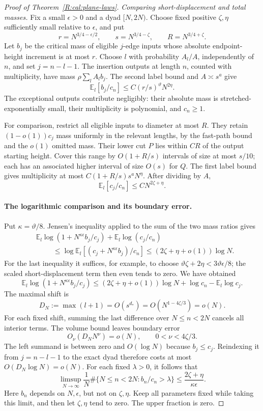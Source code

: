 \begin{proof}[Proof of Theorem~\ref{R:cal:plane-laws}]
\textit{Comparing short-displacement and total masses.}
Fix a small $\epsilon>0$ and a dyad $[N,2N)$. Choose fixed positive
$\zeta,\eta$ sufficiently small relative to $\epsilon$, and put
\[
 r=N^{3/4-\epsilon/2},\qquad
 s=N^{3/4-\zeta},\qquad R=N^{3/4+\zeta}.
\]
Let $b_j$ be the critical mass of eligible $j$-edge inputs whose absolute
endpoint-height increment is at most $r$. Choose $l$ with probability
$A_l/A$, independently of $n$, and set $j=n-l-1$. The insertion outputs
at length $n$, counted with multiplicity, have mass
$\rho\sum_l A_l b_j$. The second label bound and $A\asymp s^a$ give
\[
 \mathbb E_l[b_j/c_n]\le C(r/s)^\vartheta N^{2\eta}.
\]
The exceptional outputs contribute negligibly: their absolute mass is
stretched-exponentially small, their multiplicity is polynomial, and
$c_n\ge1$.

For comparison, restrict all eligible inputs to diameter at most $R$.
They retain $(1-o(1))c_j$ mass uniformly in the relevant lengths, by
the fast-path bound and the $o(1)$ omitted mass. Their lower cut $P$
lies within $CR$ of the output starting height. Cover this range by
$O(1+R/s)$ intervals of size at most $s/10$; each has an associated
higher interval of size $O(s)$ for $Q$. The first label bound gives
multiplicity at most $C(1+R/s)s^aN^\eta$. After dividing by $A$,
\[
 \mathbb E_l[c_j/c_n]\le CN^{2\zeta+\eta}.
\]

\paragraph{The logarithmic comparison and its boundary error.}
Put $\kappa=\vartheta/8$. Jensen's inequality applied to the sum of
the two mass ratios gives
\begin{align*}
 &\mathbb E_l\log(1+N^{\kappa\epsilon}b_j/c_j)
       +\mathbb E_l\log(c_j/c_n)\\
 &\hspace{1cm}\le
       \log\mathbb E_l[(c_j+N^{\kappa\epsilon}b_j)/c_n]
       \le(2\zeta+\eta+o(1))\log N.
\end{align*}
For the last inequality it suffices, for example, to choose
$\vartheta\zeta+2\eta<3\vartheta\epsilon/8$; the scaled short-displacement
term then even tends to zero. We have obtained
\[
 \mathbb E_l\log(1+N^{\kappa\epsilon}b_j/c_j)
 \le(2\zeta+\eta+o(1))\log N
       +\log c_n-\mathbb E_l\log c_j.
\]
The maximal shift is
\[
 D_N:=\max(l+1)=O(s^{d_*})=O(N^{1-4\zeta/3})=o(N).
\]
For each fixed shift, summing the last difference over $N\le n<2N$
cancels all interior terms. The volume bound leaves boundary error
\[
 O_\nu(D_NN^\nu)=o(N),\qquad 0<\nu<4\zeta/3.
\]
The left summand is between zero and $O(\log N)$ because $b_j\le c_j$.
Reindexing it from $j=n-l-1$ to the exact dyad therefore costs at most
$O(D_N\log N)=o(N)$. For each fixed $\lambda>0$, it follows that
\[
 \limsup_{N\to\infty}\frac1N
 \#\{N\le n<2N:b_n/c_n>\lambda\}
 \le\frac{2\zeta+\eta}{\kappa\epsilon}.
\]
Here $b_n$ depends on $N,\epsilon$, but not on $\zeta,\eta$. Keep all
parameters fixed while taking this limit, and then let $\zeta,\eta$
tend to zero. The upper fraction is zero.


\end{proof}
